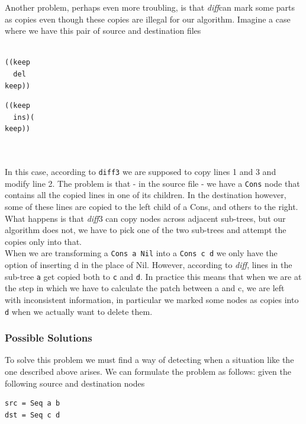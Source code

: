 \documentclass[11pt, titlepage]{article}
\newcommand{\toHaskell}[1]{\texttt{#1}\xspace}
\newcommand{\diff}{\emph{diff}}
\begin{document}
Another problem, perhaps even more troubling, is that \diff can mark some parts as copies even though these copies are illegal for our algorithm. 
Imagine a case where we have this pair of source and destination files
\\
\\
\begin{minipage}{0.5\textwidth}
\begin{verbatim}
((keep
  del
keep))
\end{verbatim}
\end{minipage}
\begin{minipage}{0.5\textwidth}
\begin{verbatim}
((keep
  ins)(
keep))
\end{verbatim}
\end{minipage}
\\
\\
In this case, according to \texttt{diff3} we are supposed to copy lines 1 and 3 
and modify line 2. The problem is that - in the source file - we have a \toHaskell{Cons} node 
that contains all the copied lines in one of its children. In the destination 
however, some of these lines are copied to the left child of a Cons, and others 
to the right. What happens is that \diff3 can copy nodes across adjacent sub-trees, 
but our algorithm does not, we have to pick one of the two sub-trees and attempt 
the copies only into that.
\\
When we are transforming a \toHaskell{Cons a Nil} into a \toHaskell{Cons c d} we only have the option of inserting d in the place of Nil. 
However, according to \diff, lines in the sub-tree \toHaskell{a} get copied both to \toHaskell{c} and \toHaskell{d}. In practice this means that when we are at the step in which we have to calculate the patch between a and c, we are left with inconsistent information, in particular we marked some nodes as copies into \toHaskell{d} when we actually want to delete them.

\subsubsection*{Possible Solutions}

To solve this problem we must find a way of detecting when a situation like the 
one described above arises. We can formulate the problem as follows:
given the following source and destination nodes

\begin{verbatim}
src = Seq a b
dst = Seq c d
\end{verbatim}
\end{document}

